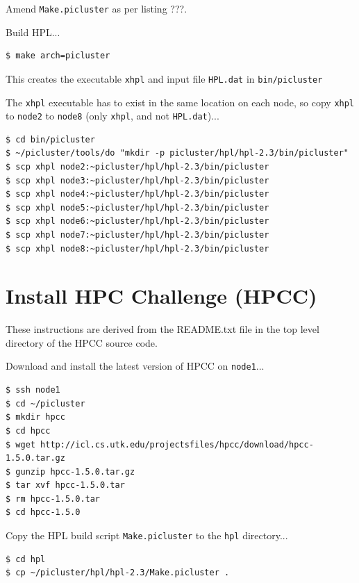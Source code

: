 \documentclass{report}
\begin{document}
Amend \verb|Make.picluster| as per listing ???.

\lstset{style=listingstyle}


Build HPL...

\lstset{style=termstyle}
\begin{lstlisting}
$ make arch=picluster   
\end{lstlisting}

This creates the executable \verb|xhpl| and input file \verb|HPL.dat| in \verb|bin/picluster|

The \verb|xhpl| executable has to exist in the same location on each node, so copy \verb|xhpl| to \verb|node2| to \verb|node8| (only \verb|xhpl|, and not \verb|HPL.dat|)...

\lstset{style=termstyle}
\begin{lstlisting}
$ cd bin/picluster
$ ~/picluster/tools/do "mkdir -p picluster/hpl/hpl-2.3/bin/picluster"
$ scp xhpl node2:~picluster/hpl/hpl-2.3/bin/picluster
$ scp xhpl node3:~picluster/hpl/hpl-2.3/bin/picluster
$ scp xhpl node4:~picluster/hpl/hpl-2.3/bin/picluster
$ scp xhpl node5:~picluster/hpl/hpl-2.3/bin/picluster
$ scp xhpl node6:~picluster/hpl/hpl-2.3/bin/picluster
$ scp xhpl node7:~picluster/hpl/hpl-2.3/bin/picluster
$ scp xhpl node8:~picluster/hpl/hpl-2.3/bin/picluster
\end{lstlisting}


%
%
\chapter{Install HPC Challenge (HPCC)}

These instructions are derived from the README.txt file in the top level directory of the HPCC source code.

Download and install the latest version of HPCC on \verb|node1|...

\lstset{style=termstyle}
\begin{lstlisting}
$ ssh node1
$ cd ~/picluster
$ mkdir hpcc
$ cd hpcc
$ wget http://icl.cs.utk.edu/projectsfiles/hpcc/download/hpcc-1.5.0.tar.gz
$ gunzip hpcc-1.5.0.tar.gz
$ tar xvf hpcc-1.5.0.tar
$ rm hpcc-1.5.0.tar
$ cd hpcc-1.5.0
\end{lstlisting}

Copy the HPL build script \verb|Make.picluster| to the \verb|hpl| directory...

\lstset{style=termstyle}
\begin{lstlisting}
$ cd hpl
$ cp ~/picluster/hpl/hpl-2.3/Make.picluster .
\end{lstlisting}
\end{document}
